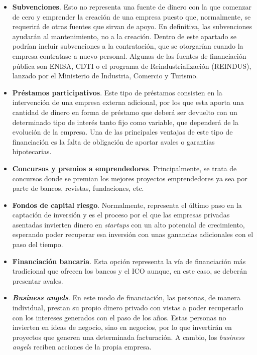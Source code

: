 \begin{itemize}
    \item \textbf{Subvenciones}. Esto no representa una fuente de dinero con la que comenzar de cero y emprender la creación de una empresa puesto que, normalmente, se requerirá de otras fuentes que sirvan de apoyo. En definitiva, las subvenciones ayudarán al mantenimiento, no a la creación. Dentro de este apartado se podrían incluir subvenciones a la contratación, que se otorgarían cuando la empresa contratase a nuevo personal. Algunas de las fuentes de financiación pública son \acf{ENISA}, \acf{CDTI} o el programa de Reindustrialización (REINDUS), lanzado por el Ministerio de Industria, Comercio y Turismo.
    
    \item \textbf{Préstamos participativos}. Este tipo de préstamos consisten en la intervención de una empresa externa adicional, por los que esta aporta una cantidad de dinero en forma de préstamo que deberá ser devuelto con un determinado tipo de interés tanto fijo como variable, que dependerá de la evolución de la empresa. Una de las principales ventajas de este tipo de financiación es la falta de obligación de aportar avales o garantías hipotecarias.
    
    \item \textbf{Concursos y premios a emprendedores}. Principalmente, se trata de concursos donde se premian los mejores proyectos emprendedores ya sea por parte de bancos, revistas, fundaciones, etc.
    
    \clearpage
    
    \item \textbf{Fondos de capital riesgo}. Normalmente, representa el último paso en la captación de inversión y es el proceso por el que las empresas privadas asentadas invierten dinero en \textit{startups} con un alto potencial de crecimiento, esperando poder recuperar esa inversión con unas ganancias adicionales con el paso del tiempo.
    
    \item \textbf{Financiación bancaria}. Esta opción representa la vía de financiación más tradicional que ofrecen los bancos y el \acf{ICO} aunque, en este caso, se deberán presentar avales.
    
    \item \textbf{\textit{Business angels}}. En este modo de financiación, las personas, de manera individual, prestan su propio dinero privado con vistas a poder recuperarlo con los intereses generados con el paso de los años. Estas personas no invierten en ideas de negocio, sino en negocios, por lo que invertirán en proyectos que generen una determinada facturación. A cambio, los \textit{business angels} reciben acciones de la propia empresa.
    

\end{itemize}
